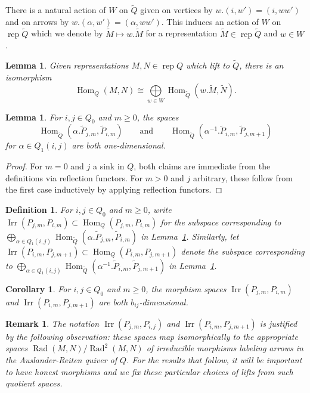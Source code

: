 \documentclass{amsart}
\newtheorem{corollary}[theorem]{Corollary}
\newtheorem{definition}[theorem]{Definition}
\newtheorem{lemma}[theorem]{Lemma}
\newtheorem{remark}[theorem]{Remark}
\numberwithin{equation}{section}
\newcommand{\Hom}{\operatorname{Hom}}
\newcommand{\Irr}{\operatorname{Irr}}
\newcommand{\Rad}{\operatorname{Rad}}
\newcommand{\rep}{\operatorname{rep}}
\begin{document}
There is a natural action of $W$ on $\widetilde{Q}$ given on vertices by $w.(i,w')=(i,ww')$ and on arrows by $w.(\alpha,w')=(\alpha,ww')$.
This induces an action of $W$ on $\rep\widetilde{Q}$ which we denote by $\widetilde{M}\mapsto w.\widetilde{M}$ for a representation $\widetilde{M}\in\rep\widetilde{Q}$ and $w\in W$.
\begin{lemma}
  \label{le:hom lifts}
  Given representations $M,N\in\rep Q$ which lift to $\widetilde{Q}$, there is an isomorphism 
  \[\Hom_Q(M,N)\cong\bigoplus\limits_{w\in W} \Hom_{\widetilde{Q}}(w.\widetilde{M},\widetilde{N}).\]
\end{lemma}
\begin{lemma}
  For $i,j\in Q_0$ and $m\ge0$, the spaces 
  \[\Hom_{\widetilde{Q}}(\alpha.\widetilde{P}_{j,m},\widetilde{P}_{i,m})\qquad\text{and}\qquad\Hom_{\widetilde{Q}}(\alpha^{-1}.\widetilde{P}_{i,m},\widetilde{P}_{j,m+1})\]
  for $\alpha\in Q_1(i,j)$ are both one-dimensional.
\end{lemma}
\begin{proof}
  For $m=0$ and $j$ a sink in $Q$, both claims are immediate from the definitions via reflection functors.
  For $m>0$ and $j$ arbitrary, these follow from the first case inductively by applying reflection functors.
\end{proof}
\begin{definition}
  For $i,j\in Q_0$ and $m\ge0$, write $\Irr(P_{j,m},P_{i,m})\subset\Hom_Q(P_{j,m},P_{i,m})$ for the subspace corresponding to $\bigoplus_{\alpha\in Q_1(i,j)} \Hom_{\widetilde{Q}}(\alpha.\widetilde{P}_{j,m},\widetilde{P}_{i,m})$ in Lemma~\ref{le:hom lifts}.
  Similarly, let $\Irr(P_{i,m},P_{j,m+1})\subset\Hom_Q(P_{i,m},P_{j,m+1})$ denote the subspace corresponding to $\bigoplus_{\alpha\in Q_1(i,j)} \Hom_{\widetilde{Q}}(\alpha^{-1}.\widetilde{P}_{i,m},\widetilde{P}_{j,m+1})$ in Lemma~\ref{le:hom lifts}.
\end{definition}
\begin{corollary}
  For $i,j\in Q_0$ and $m\ge0$, the morphism spaces $\Irr(P_{j,m},P_{i,m})$ and $\Irr(P_{i,m},P_{j,m+1})$ are both $b_{ij}$-dimensional.
\end{corollary}
\begin{remark}
  The notation $\Irr(P_{j,m},P_{i,j})$ and $\Irr(P_{i,m},P_{j,m+1})$ is justified by the following observation: these spaces map isomorphically to the appropriate spaces $\Rad(M,N)/\Rad^2(M,N)$ of irreducible morphisms labeling arrows in the Auslander-Reiten quiver of $Q$.
  For the results that follow, it will be important to have honest morphisms and we fix these particular choices of lifts from such quotient spaces.
\end{remark}
\end{document}
